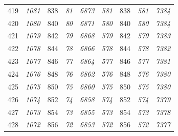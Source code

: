 \documentclass[10pt,fleqn]{article}
\begin{document}
\begin{longtable}{c|cccccccc}
419 & {\color{blue} \it 1081 \rm} & {\color{black} 838} & {\color{blue} \it 81 \rm} & {\color{blue} \it 6873 \rm} & {\color{blue} \it 581 \rm} & {\color{black} 838} & {\color{blue} \it 581 \rm} & {\color{blue} \it 7384 \rm} \\
420 & {\color{blue} \it 1080 \rm} & {\color{black} 840} & {\color{blue} \it 80 \rm} & {\color{blue} \it 6871 \rm} & {\color{blue} \it 580 \rm} & {\color{black} 840} & {\color{blue} \it 580 \rm} & {\color{blue} \it 7384 \rm} \\
421 & {\color{blue} \it 1079 \rm} & {\color{black} 842} & {\color{blue} \it 79 \rm} & {\color{blue} \it 6868 \rm} & {\color{blue} \it 579 \rm} & {\color{black} 842} & {\color{blue} \it 579 \rm} & {\color{blue} \it 7383 \rm} \\
422 & {\color{blue} \it 1078 \rm} & {\color{black} 844} & {\color{blue} \it 78 \rm} & {\color{blue} \it 6866 \rm} & {\color{blue} \it 578 \rm} & {\color{black} 844} & {\color{blue} \it 578 \rm} & {\color{blue} \it 7382 \rm} \\
423 & {\color{blue} \it 1077 \rm} & {\color{black} 846} & {\color{blue} \it 77 \rm} & {\color{blue} \it 6864 \rm} & {\color{blue} \it 577 \rm} & {\color{black} 846} & {\color{blue} \it 577 \rm} & {\color{blue} \it 7381 \rm} \\
424 & {\color{blue} \it 1076 \rm} & {\color{black} 848} & {\color{blue} \it 76 \rm} & {\color{blue} \it 6862 \rm} & {\color{blue} \it 576 \rm} & {\color{black} 848} & {\color{blue} \it 576 \rm} & {\color{blue} \it 7380 \rm} \\
425 & {\color{blue} \it 1075 \rm} & {\color{black} 850} & {\color{blue} \it 75 \rm} & {\color{blue} \it 6860 \rm} & {\color{blue} \it 575 \rm} & {\color{black} 850} & {\color{blue} \it 575 \rm} & {\color{blue} \it 7380 \rm} \\
426 & {\color{blue} \it 1074 \rm} & {\color{black} 852} & {\color{blue} \it 74 \rm} & {\color{blue} \it 6858 \rm} & {\color{blue} \it 574 \rm} & {\color{black} 852} & {\color{blue} \it 574 \rm} & {\color{blue} \it 7379 \rm} \\
427 & {\color{blue} \it 1073 \rm} & {\color{black} 854} & {\color{blue} \it 73 \rm} & {\color{blue} \it 6855 \rm} & {\color{blue} \it 573 \rm} & {\color{black} 854} & {\color{blue} \it 573 \rm} & {\color{blue} \it 7378 \rm} \\
428 & {\color{blue} \it 1072 \rm} & {\color{black} 856} & {\color{blue} \it 72 \rm} & {\color{blue} \it 6853 \rm} & {\color{blue} \it 572 \rm} & {\color{black} 856} & {\color{blue} \it 572 \rm} & {\color{blue} \it 7377 \rm} \\

\end{longtable}
\end{document}
